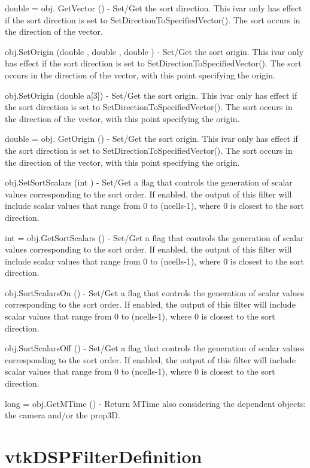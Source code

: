 \begin{DoxyItemize}
\item {\ttfamily double = obj. Get\-Vector ()} -\/ Set/\-Get the sort direction. This ivar only has effect if the sort direction is set to Set\-Direction\-To\-Specified\-Vector(). The sort occurs in the direction of the vector.  
\item {\ttfamily obj.\-Set\-Origin (double , double , double )} -\/ Set/\-Get the sort origin. This ivar only has effect if the sort direction is set to Set\-Direction\-To\-Specified\-Vector(). The sort occurs in the direction of the vector, with this point specifying the origin.  
\item {\ttfamily obj.\-Set\-Origin (double a\mbox{[}3\mbox{]})} -\/ Set/\-Get the sort origin. This ivar only has effect if the sort direction is set to Set\-Direction\-To\-Specified\-Vector(). The sort occurs in the direction of the vector, with this point specifying the origin.  
\item {\ttfamily double = obj. Get\-Origin ()} -\/ Set/\-Get the sort origin. This ivar only has effect if the sort direction is set to Set\-Direction\-To\-Specified\-Vector(). The sort occurs in the direction of the vector, with this point specifying the origin.  
\item {\ttfamily obj.\-Set\-Sort\-Scalars (int )} -\/ Set/\-Get a flag that controls the generation of scalar values corresponding to the sort order. If enabled, the output of this filter will include scalar values that range from 0 to (ncells-\/1), where 0 is closest to the sort direction.  
\item {\ttfamily int = obj.\-Get\-Sort\-Scalars ()} -\/ Set/\-Get a flag that controls the generation of scalar values corresponding to the sort order. If enabled, the output of this filter will include scalar values that range from 0 to (ncells-\/1), where 0 is closest to the sort direction.  
\item {\ttfamily obj.\-Sort\-Scalars\-On ()} -\/ Set/\-Get a flag that controls the generation of scalar values corresponding to the sort order. If enabled, the output of this filter will include scalar values that range from 0 to (ncells-\/1), where 0 is closest to the sort direction.  
\item {\ttfamily obj.\-Sort\-Scalars\-Off ()} -\/ Set/\-Get a flag that controls the generation of scalar values corresponding to the sort order. If enabled, the output of this filter will include scalar values that range from 0 to (ncells-\/1), where 0 is closest to the sort direction.  
\item {\ttfamily long = obj.\-Get\-M\-Time ()} -\/ Return M\-Time also considering the dependent objects\-: the camera and/or the prop3\-D.  
\end{DoxyItemize}\hypertarget{vtkhybrid_vtkdspfilterdefinition}{}\section{vtk\-D\-S\-P\-Filter\-Definition}\label{vtkhybrid_vtkdspfilterdefinition}
